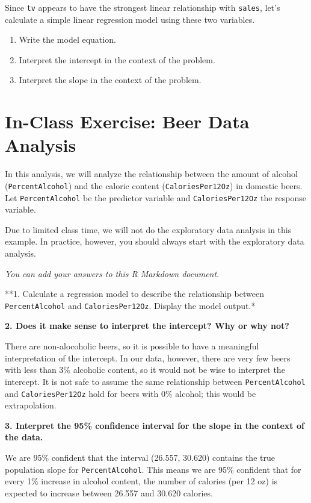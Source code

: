 \documentclass[]{book}
\providecommand{\tightlist}{%
  \setlength{\itemsep}{0pt}\setlength{\parskip}{0pt}}
\begin{document}
Since \texttt{tv} appears to have the strongest linear relationship with
\texttt{sales}, let's calculate a simple linear regression model using
these two variables.

\begin{enumerate}
\def\labelenumi{\arabic{enumi}.}
\tightlist
\item
  Write the model equation.
\item
  Interpret the intercept in the context of the problem.
\item
  Interpret the slope in the context of the problem.
\end{enumerate}

\section{In-Class Exercise: Beer Data
Analysis}\label{in-class-exercise-beer-data-analysis}

In this analysis, we will analyze the relationship between the amount of
alcohol (\texttt{PercentAlcohol}) and the caloric content
(\texttt{CaloriesPer12Oz}) in domestic beers. Let
\texttt{PercentAlcohol} be the predictor variable and
\texttt{CaloriesPer12Oz} the response variable.

Due to limited class time, we will not do the exploratory data analysis
in this example. In practice, however, you should always start with the
exploratory data analysis.

\emph{You can add your answers to this R Markdown document}.

**1. Calculate a regression model to describe the relationship between
\texttt{PercentAlcohol} and \texttt{CaloriesPer12Oz}. Display the model
output.*

\textbf{2. Does it make sense to interpret the intercept? Why or why
not?}

There are non-alocoholic beers, so it is possible to have a meaningful
interpretation of the intercept. In our data, however, there are very
few beers with less than 3\% alcoholic content, so it would not be wise
to interpret the intercept. It is not safe to assume the same
relationship between \texttt{PercentAlcohol} and
\texttt{CaloriesPer12Oz} hold for beers with 0\% alcohol; this would be
extrapolation.

\textbf{3. Interpret the 95\% confidence interval for the slope in the
context of the data.}

We are 95\% confident that the interval (26.557, 30.620) contains the
true population slope for \texttt{PercentAlcohol}. This means we are
95\% confident that for every 1\% increase in alcohol content, the
number of calories (per 12 oz) is expected to increase between 26.557
and 30.620 calories.
\end{document}
